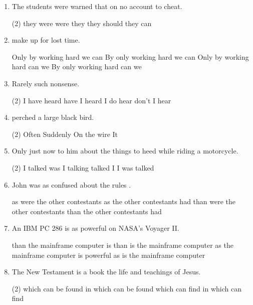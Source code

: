 \begin{enumerate}

\item The students were warned that on no account \ttu to cheat.
\begin{tasks}(2)
  \task they were
  \task were they
  \task they should
  \task they can
\end{tasks}

\item \ttu make up for lost time.
\begin{tasks}
  \task Only by working hard we can
  \task By only working hard we can
  \task Only by working hard can we
  \task By only working hard can we
\end{tasks}

\item Rarely \ttu such nonsense.
\begin{tasks}(2)
  \task I have heard
  \task have I heard
  \task I do hear
  \task don't I hear
\end{tasks}

\item \ttu perched a large black bird.
\begin{tasks}(2)
  \task Often
  \task Suddenly
  \task On the wire
  \task It
\end{tasks}

\item Only just now \ttu to him about the things to heed while riding a
  motorcycle.
\begin{tasks}(2)
  \task I talked
  \task was I talking
  \task talked I
  \task I was talked
\end{tasks}

\item John was as confused about the rules \ttu.
\begin{tasks}
  \task as were the other contestants
  \task as the other contestants had
  \task than were the other contestants
  \task than the other contestants had
\end{tasks}

\item An IBM PC 286 is as powerful \ttu on NASA's Voyager II.
\begin{tasks}
  \task than the mainframe computer is
  \task than is the mainframe computer
  \task as the mainframe computer is powerful
  \task as is the mainframe computer
\end{tasks}

\item The New Testament is a book \ttu the life and teachings of Jesus.
\begin{tasks}(2)
  \task which can be found
  \task in which can be found
  \task which can find
  \task in which can find
\end{tasks}


\end{enumerate}
